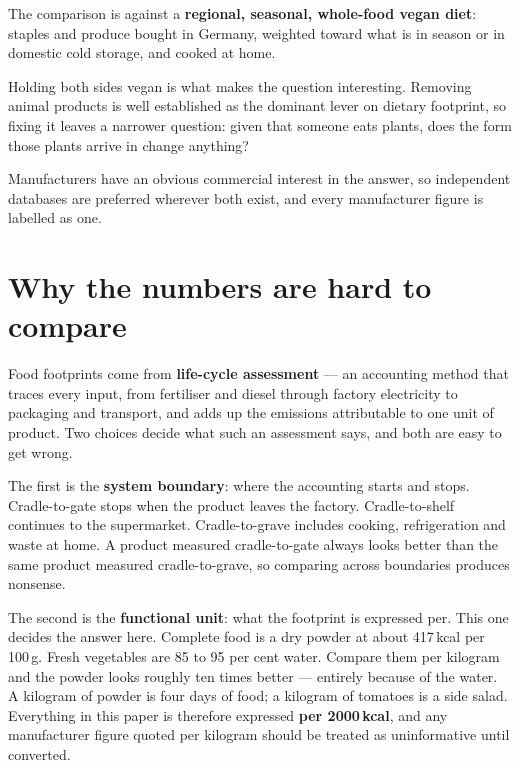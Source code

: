 \documentclass[11pt,a4paper]{article}
\begin{document}
The comparison is against a \textbf{regional, seasonal, whole-food vegan diet}:
staples and produce bought in Germany, weighted toward what is in season or in
domestic cold storage, and cooked at home.

Holding both sides vegan is what makes the question interesting. Removing animal
products is well established as the dominant lever on dietary footprint, so fixing
it leaves a narrower question: given that someone eats plants, does the form those
plants arrive in change anything?

Manufacturers have an obvious commercial interest in the answer, so independent
databases are preferred wherever both exist, and every manufacturer figure is
labelled as one.

\section{Why the numbers are hard to compare}

Food footprints come from \textbf{life-cycle assessment} — an accounting method that
traces every input, from fertiliser and diesel through factory electricity to
packaging and transport, and adds up the emissions attributable to one unit of
product. Two choices decide what such an assessment says, and both are easy to get
wrong.

The first is the \textbf{system boundary}: where the accounting starts and stops.
Cradle-to-gate stops when the product leaves the factory. Cradle-to-shelf continues
to the supermarket. Cradle-to-grave includes cooking, refrigeration and waste at
home. A product measured cradle-to-gate always looks better than the same product
measured cradle-to-grave, so comparing across boundaries produces nonsense.

The second is the \textbf{functional unit}: what the footprint is expressed per. This
one decides the answer here. Complete food is a dry powder at about 417\,kcal per
100\,g. Fresh vegetables are 85 to 95 per cent water. Compare them per kilogram and
the powder looks roughly ten times better — entirely because of the water. A kilogram
of powder is four days of food; a kilogram of tomatoes is a side salad. Everything in
this paper is therefore expressed \textbf{per 2000\,kcal}, and any manufacturer
figure quoted per kilogram should be treated as uninformative until converted.
\end{document}
